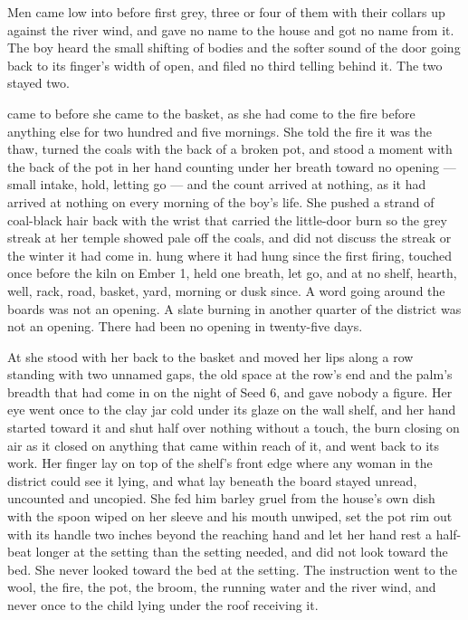 Men came low into  before first grey, three or four of them with their collars up against the river wind, and gave no name to the house and got no name from it. The boy heard the small shifting of bodies and the softer sound of the door going back to its finger's width of open, and filed no third telling behind it. The two stayed two.

\scenebreak

 came to  before she came to the basket, as she had come to the fire before anything else for two hundred and five mornings. She told the fire it was the thaw, turned the coals with the back of a broken pot, and stood a moment with the back of the pot in her hand counting under her breath toward no opening --- small intake, hold, letting go --- and the count arrived at nothing, as it had arrived at nothing on every morning of the boy's life. She pushed a strand of coal-black hair back with the wrist that carried the little-door burn so the grey streak at her temple showed pale off the coals, and did not discuss the streak or the winter it had come in.  hung where it had hung since the first firing, touched once before the kiln on Ember 1, held one breath, let go, and at no shelf, hearth, well, rack, road, basket, yard, morning or dusk since. A word going around the boards was not an opening. A slate burning in another quarter of the district was not an opening. There had been no opening in twenty-five days.

At  she stood with her back to the basket and moved her lips along a row standing with two unnamed gaps, the old space at the row's end and the palm's breadth that had come in on the night of Seed 6, and gave nobody a figure. Her eye went once to the clay jar cold under its glaze on the wall shelf, and her hand started toward it and shut half over nothing without a touch, the burn closing on air as it closed on anything that came within reach of it, and went back to its work. Her finger lay on top of the shelf's front edge where any woman in the district could see it lying, and what lay beneath the board stayed unread, uncounted and uncopied. She fed him barley gruel from the house's own dish with the spoon wiped on her sleeve and his mouth unwiped, set the pot rim out with its handle two inches beyond the reaching hand and let her hand rest a half-beat longer at the setting than the setting needed, and did not look toward the bed. She never looked toward the bed at the setting. The instruction went to the wool, the fire, the pot, the broom, the running water and the river wind, and never once to the child lying under the roof receiving it.

